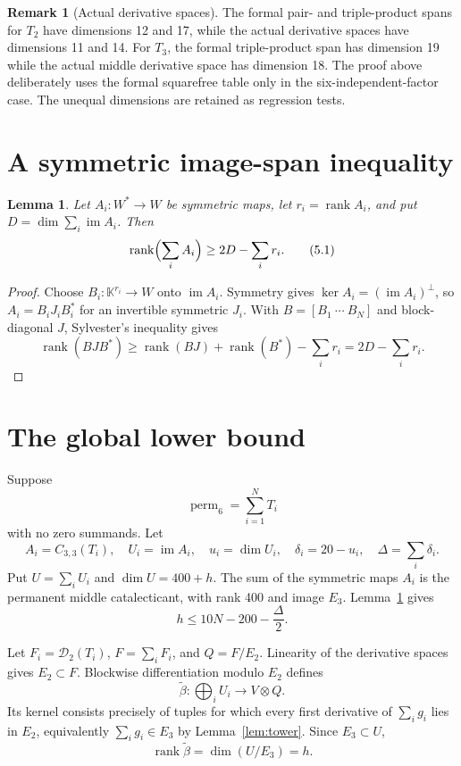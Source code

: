 \documentclass[11pt]{amsart}
\newcommand{\K}{\mathbb{K}}
\newcommand{\im}{\operatorname{im}}
\newcommand{\rank}{\operatorname{rank}}
\newcommand{\perm}{\operatorname{perm}}
\newcommand{\cD}{\mathcal{D}}
\newtheorem{lemma}[theorem]{Lemma}
\theoremstyle{definition}
\newtheorem{remark}[theorem]{Remark}
\begin{document}
\begin{remark}[Actual derivative spaces]\label{rem:actual-spaces}
The formal pair- and triple-product spans for \(T_2\) have dimensions 12
and 17, while the actual derivative spaces have dimensions 11 and 14. For
\(T_3\), the formal triple-product span has dimension 19 while the actual
middle derivative space has dimension 18. The proof above deliberately uses
the formal squarefree table only in the six-independent-factor case. The
unequal dimensions are retained as regression tests.
\end{remark}

\section{A symmetric image-span inequality}

\begin{lemma}\label{lem:image-span}
Let \(A_i:W^*\to W\) be symmetric maps, let \(r_i=\rank A_i\), and put
\(D=\dim\sum_i\im A_i\). Then
\[
 \rank\Bigl(\sum_iA_i\Bigr)\ge2D-\sum_i r_i. \tag{5.1}
\]
\end{lemma}

\begin{proof}
Choose \(B_i:\K^{r_i}\to W\) onto \(\im A_i\). Symmetry gives
\(\ker A_i=(\im A_i)^\perp\), so
\(A_i=B_iJ_iB_i^*\) for an invertible symmetric \(J_i\). With
\(B=[B_1\ \cdots\ B_N]\) and block-diagonal \(J\), Sylvester's inequality
gives
\[
 \rank(BJB^*)\ge\rank(BJ)+\rank(B^*)-\sum_i r_i
 =2D-\sum_i r_i.
\]
\end{proof}

\section{The global lower bound}\label{sec:global}

Suppose
\[
 \perm_6=\sum_{i=1}^NT_i
\]
with no zero summands. Let
\[
 A_i=C_{3,3}(T_i),\quad U_i=\im A_i,\quad u_i=\dim U_i,
 \quad\delta_i=20-u_i,\quad\Delta=\sum_i\delta_i.
\]
Put \(U=\sum_iU_i\) and \(\dim U=400+h\). The sum of the symmetric maps
\(A_i\) is the permanent middle catalecticant, with rank 400 and image
\(E_3\). Lemma~\ref{lem:image-span} gives
\[
 \boxed{h\le10N-200-\frac\Delta2.} \tag{6.1}
\]

Let \(F_i=\cD_2(T_i)\), \(F=\sum_iF_i\), and \(Q=F/E_2\). Linearity of
the derivative spaces gives \(E_2\subset F\). Blockwise differentiation
modulo \(E_2\) defines
\[
 \widetilde\beta:\bigoplus_iU_i\longrightarrow V\otimes Q.
\]
Its kernel consists precisely of tuples for which every first derivative of
\(\sum_i g_i\) lies in \(E_2\), equivalently
\(\sum_i g_i\in E_3\) by Lemma~\ref{lem:tower}. Since \(E_3\subset U\),
\[
 \rank\widetilde\beta=\dim(U/E_3)=h. \tag{6.2}
\]
\end{document}
